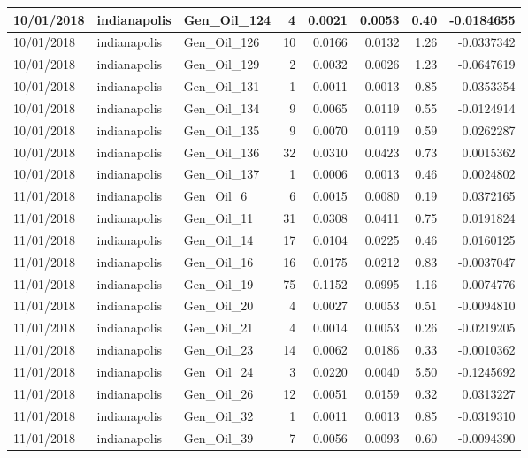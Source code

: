 \documentclass[
  letterpaper,
  DIV=11,
  numbers=noendperiod]{scrartcl}
\begin{document}
\begin{tabular}{l|l|l|r|r|r|r|r}
\hline
10/01/2018 & indianapolis & Gen\_Oil\_124 & 4 & 0.0021 & 0.0053 & 0.40 & -0.0184655\\
\hline
10/01/2018 & indianapolis & Gen\_Oil\_126 & 10 & 0.0166 & 0.0132 & 1.26 & -0.0337342\\
\hline
10/01/2018 & indianapolis & Gen\_Oil\_129 & 2 & 0.0032 & 0.0026 & 1.23 & -0.0647619\\
\hline
10/01/2018 & indianapolis & Gen\_Oil\_131 & 1 & 0.0011 & 0.0013 & 0.85 & -0.0353354\\
\hline
10/01/2018 & indianapolis & Gen\_Oil\_134 & 9 & 0.0065 & 0.0119 & 0.55 & -0.0124914\\
\hline
10/01/2018 & indianapolis & Gen\_Oil\_135 & 9 & 0.0070 & 0.0119 & 0.59 & 0.0262287\\
\hline
10/01/2018 & indianapolis & Gen\_Oil\_136 & 32 & 0.0310 & 0.0423 & 0.73 & 0.0015362\\
\hline
10/01/2018 & indianapolis & Gen\_Oil\_137 & 1 & 0.0006 & 0.0013 & 0.46 & 0.0024802\\
\hline
11/01/2018 & indianapolis & Gen\_Oil\_6 & 6 & 0.0015 & 0.0080 & 0.19 & 0.0372165\\
\hline
11/01/2018 & indianapolis & Gen\_Oil\_11 & 31 & 0.0308 & 0.0411 & 0.75 & 0.0191824\\
\hline
11/01/2018 & indianapolis & Gen\_Oil\_14 & 17 & 0.0104 & 0.0225 & 0.46 & 0.0160125\\
\hline
11/01/2018 & indianapolis & Gen\_Oil\_16 & 16 & 0.0175 & 0.0212 & 0.83 & -0.0037047\\
\hline
11/01/2018 & indianapolis & Gen\_Oil\_19 & 75 & 0.1152 & 0.0995 & 1.16 & -0.0074776\\
\hline
11/01/2018 & indianapolis & Gen\_Oil\_20 & 4 & 0.0027 & 0.0053 & 0.51 & -0.0094810\\
\hline
11/01/2018 & indianapolis & Gen\_Oil\_21 & 4 & 0.0014 & 0.0053 & 0.26 & -0.0219205\\
\hline
11/01/2018 & indianapolis & Gen\_Oil\_23 & 14 & 0.0062 & 0.0186 & 0.33 & -0.0010362\\
\hline
11/01/2018 & indianapolis & Gen\_Oil\_24 & 3 & 0.0220 & 0.0040 & 5.50 & -0.1245692\\
\hline
11/01/2018 & indianapolis & Gen\_Oil\_26 & 12 & 0.0051 & 0.0159 & 0.32 & 0.0313227\\
\hline
11/01/2018 & indianapolis & Gen\_Oil\_32 & 1 & 0.0011 & 0.0013 & 0.85 & -0.0319310\\
\hline
11/01/2018 & indianapolis & Gen\_Oil\_39 & 7 & 0.0056 & 0.0093 & 0.60 & -0.0094390\\

\end{tabular}
\end{document}
